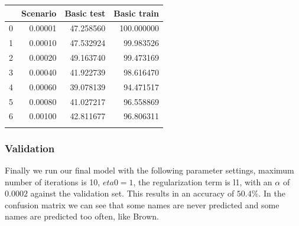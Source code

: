 \documentclass[11pt]{article}
\begin{document}
\begin{tabular}{lrrr}
\toprule
{} &  Scenario &  Basic test &  Basic train \\
\midrule
0 &   0.00001 &   47.258560 &   100.000000 \\
1 &   0.00010 &   47.532924 &    99.983526 \\
2 &   0.00020 &   49.163740 &    99.473169 \\
3 &   0.00040 &   41.922739 &    98.616470 \\
4 &   0.00060 &   39.078139 &    94.471517 \\
5 &   0.00080 &   41.027217 &    96.558869 \\
6 &   0.00100 &   42.811677 &    96.806311 \\
\bottomrule
\label{Accuracy testing for alphas}
\end{tabular} 

\subsubsection{Validation}
Finally we run our final model with the following parameter settings, maximum number of iterations is 10, $eta0=1$, the regularization term is l1, with an $\alpha$ of $0.0002$ against the validation set. This results in an accuracy of $50.4\%$. In the confusion matrix we can see that some names are never predicted and some names are predicted too often, like Brown. 
%
%
\end{document}
